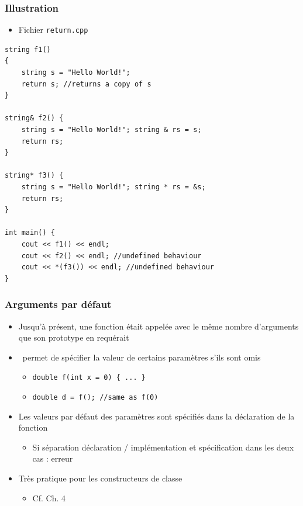 \begin{frame}[containsverbatim]
\frametitle{Illustration}
\begin{itemize}
\item Fichier \texttt{return.cpp}
\end{itemize}
\begin{lstlisting}
string f1()
{
    string s = "Hello World!";
    return s; //returns a copy of s
}

string& f2() {
    string s = "Hello World!"; string & rs = s;
    return rs;
}

string* f3() {
    string s = "Hello World!"; string * rs = &s;
    return rs;
}

int main() {
    cout << f1() << endl;
    cout << f2() << endl; //undefined behaviour
    cout << *(f3()) << endl; //undefined behaviour
}
\end{lstlisting}
\end{frame}

\begin{frame}
\frametitle{Arguments par défaut}
\begin{itemize}[<+->]
\item Jusqu'à présent, une fonction était appelée avec le même nombre d'arguments que son prototype en requérait
\item \cpp\ permet de spécifier la valeur de certains paramètres s'ils sont omis
	\begin{itemize}
	\item \lstinline|double f(int x = 0) { ... }|
	\item \lstinline|double d = f(); //same as f(0)|
	\end{itemize}
\item Les valeurs par défaut des paramètres sont spécifiés dans la déclaration de la fonction
	\begin{itemize}
	\item Si séparation déclaration / implémentation et spécification dans les deux cas : erreur
	\end{itemize}
\item Très pratique pour les constructeurs de classe
	\begin{itemize}
	\item Cf. Ch. 4
	\end{itemize}
\end{itemize}
\end{frame}

